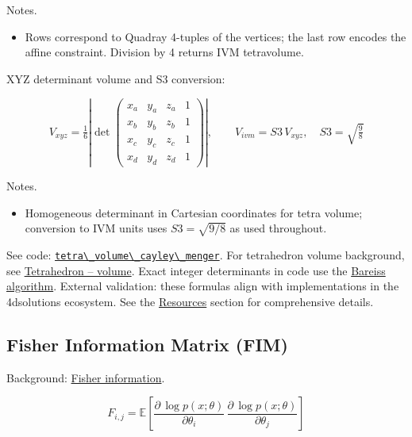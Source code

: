 \documentclass[
  10pt,
]{article}
\newcommand{\passthrough}[1]{#1}
\providecommand{\tightlist}{%
  \setlength{\itemsep}{0pt}\setlength{\parskip}{0pt}}
\begin{document}
Notes.

\begin{itemize}
\tightlist
\item
  Rows correspond to Quadray 4-tuples of the vertices; the last row
  encodes the affine constraint. Division by 4 returns IVM tetravolume.
\end{itemize}

XYZ determinant volume and S3 conversion:

\begin{equation}\label{eq:supp_xyz_det}
V_{xyz} = \tfrac{1}{6} \left| \det \begin{pmatrix}
 x_a & y_a & z_a & 1 \\
 x_b & y_b & z_b & 1 \\
 x_c & y_c & z_c & 1 \\
  x_d & y_d & z_d & 1
\end{pmatrix} \right|, \qquad V_{ivm} = S3\, V_{xyz},\quad S3=\sqrt{\tfrac{9}{8}}
\end{equation}

Notes.

\begin{itemize}
\tightlist
\item
  Homogeneous determinant in Cartesian coordinates for tetra volume;
  conversion to IVM units uses \(S3=\sqrt{9/8}\) as used throughout.
\end{itemize}

See code:
\href{03_quadray_methods.md\#code:tetra_volume_cayley_menger}{\passthrough{\lstinline!tetra\_volume\_cayley\_menger!}}.
For tetrahedron volume background, see
\href{https://en.wikipedia.org/wiki/Tetrahedron\#Volume}{Tetrahedron --
volume}. Exact integer determinants in code use the
\href{https://en.wikipedia.org/wiki/Bareiss_algorithm}{Bareiss
algorithm}. External validation: these formulas align with
implementations in the 4dsolutions ecosystem. See the
\href{07_resources.md}{Resources} section for comprehensive details.

\hypertarget{eq:fim}{%
\subsection{Fisher Information Matrix (FIM)}\label{eq:fim}}

Background:
\href{https://en.wikipedia.org/wiki/Fisher_information}{Fisher
information}.

\begin{equation}\label{eq:supp_fim}
F_{i,j} = \mathbb{E}\left[ \frac{\partial \, \log p(x;\theta)}{\partial \theta_i}\, \frac{\partial \, \log p(x;\theta)}{\partial \theta_j} \right]
\end{equation}
\end{document}
